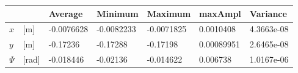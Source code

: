 \begin{tabular}{lllllll}
& & Average & Minimum & Maximum & maxAmpl & Variance \\ 
\hline 
$x$ &[m]& -0.0076628 & -0.0082233 & -0.0071825 & 0.0010408 & 4.3663e-08 \\ 
$y$ &[m]&-0.17236 & -0.17288 & -0.17198 & 0.00089951 & 2.6465e-08 \\ 
$\Psi$&[rad]& -0.018446 & -0.02136 & -0.014622 & 0.006738 & 1.0167e-06 \\ 
\hline 
\end{tabular}